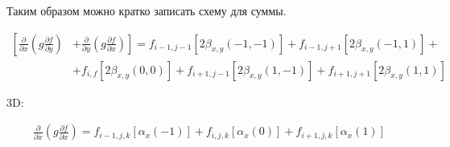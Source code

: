 Таким образом можно кратко записать схему для суммы.

\begin{equation*}
    \begin{split}
        \left[
            \frac
                {\partial}
                {\partial x}
            \left(
                g
                \frac
                    {\partial f}
                    {\partial y}
            \right)
        \right.
            &
        \left.
            +
            \frac
                {\partial}
                {\partial y}
            \left(
                g
                \frac
                    {\partial f}
                    {\partial x}
            \right)
        \right]
        =
        f_{i-1, j-1}
        \left[
            2
            \beta_{x,y} \left(-1, -1\right)
        \right]
        +
        f_{i-1, j+1}
        \left[
            2
            \beta_{x,y} \left(-1, 1\right)
        \right]
        +
        \\
        &
        +
        f_{i,f}
        \left[
            2
            \beta_{x,y} \left(0, 0\right)
        \right]
        +
        f_{i+1, j-1}
        \left[
            2
            \beta_{x,y} \left(1, -1\right)
        \right]
        +
        f_{i+1, j+1}
        \left[
            2
            \beta_{x,y} \left(1, 1\right)
        \right]
    \end{split}
\end{equation*}

3D:

\begin{equation*}
    \begin{split}
        \frac
            {\partial}
            {\partial x}
        \left(
            g
            \frac
                {\partial f}
                {\partial x}
        \right)
        =
        f_{i-1, j, k}
        \left[
            \alpha_{x} \left(-1\right)
        \right]
        +
        f_{i, j, k}
        \left[
            \alpha_{x} \left(0\right)
        \right]
        +
        f_{i+1, j, k}
        \left[
            \alpha_{x} \left(1\right)
        \right]
    \end{split}
\end{equation*}

